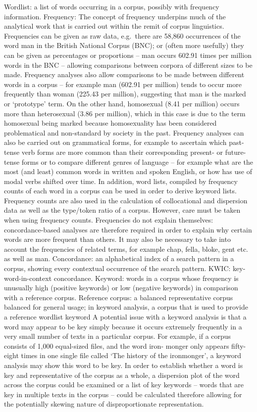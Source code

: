 \documentclass[]{book}
\begin{document}
Wordlist: a list of words occurring in a corpus, possibly with frequency information.
Frequency: The concept of frequency underpins much of the analytical work that is carried out within the remit of corpus linguistics.
Frequencies can be given as raw data, e.g.~there are 58,860 occurrences of the word man in the British National Corpus (BNC); or (often more usefully) they can be given as percentages or proportions -- man occurs 602.91 times per million words in the BNC -- allowing comparisons between corpora of different sizes to be made.
Frequency analyses also allow comparisons to be made between different words in a corpus -- for example man (602.91 per million) tends to occur more frequently than woman (225.43 per million), suggesting that man is the marked or `prototype' term. On the other hand, homosexual (8.41 per million) occurs more than heterosexual (3.86 per million), which in this case is due to the term homosexual being marked because homosexuality has been considered problematical and non-standard by society in the past.
Frequency analyses can also be carried out on grammatical forms, for example to ascertain which past-tense verb forms are more common than their corresponding present- or future-tense forms or to compare different genres of language -- for example what are the most (and least) common words in written and spoken English, or how has use of modal verbs shifted over time.
In addition, word lists, compiled by frequency counts of each word in a corpus can be used in order to derive keyword lists. Frequency counts are also used in the calculation of collocational and dispersion data as well as the type/token ratio of a corpus. However, care must be taken when using frequency counts. Frequencies do not explain themselves: concordance-based analyses are therefore required in order to explain why certain words are more frequent than others. It may also be necessary to take into account the frequencies of related terms, for example chap, fella, bloke, gent etc. as well as man.
Concordance: an alphabetical index of a search pattern in a corpus, showing every contextual occurrence of the search pattern.
KWIC: key-word-in-context concordance.
Keyword: words in a corpus whose frequency is unusually high (positive keywords) or low (negative keywords) in comparison with a reference corpus.
Reference corpus: a balanced representative corpus balanced for general usage; in keyword analysis, a corpus that is used to provide a reference wordlist
keyword A potential issue with a keyword analysis is that a word may appear to be key simply because it occurs extremely frequently in a very small number of texts in a particular corpus. For example, if a corpus consists of 1,000 equal-sized files, and the word iron- monger only appears fifty-eight times in one single file called `The history of the ironmonger', a keyword analysis may show this word to be key. In order to establish whether a word is key and representative of the corpus as a whole, a dispersion plot of the word across the corpus could be examined or a list of key keywords -- words that are key in multiple texts in the corpus -- could be calculated therefore allowing for the potentially skewing nature of disproportionate representation.
\end{document}
